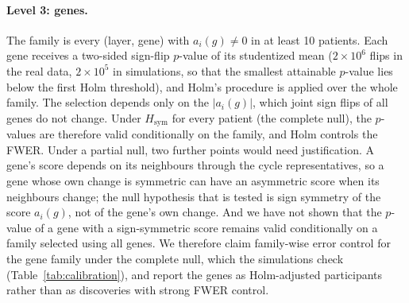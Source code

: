 \paragraph{Level 3: genes.} The family is every (layer, gene) with $a_i(g)\ne0$ in at least 10 patients. Each gene receives a two-sided sign-flip $p$-value of its studentized mean ($2\times10^{6}$ flips in the real data, $2\times10^{5}$ in simulations, so that the smallest attainable $p$-value lies below the first Holm threshold), and Holm's procedure is applied over the whole family. The selection depends only on the $|a_i(g)|$, which joint sign flips of all genes do not change. Under $H_{\mathrm{sym}}$ for every patient (the complete null), the $p$-values are therefore valid conditionally on the family, and Holm controls the FWER. Under a partial null, two further points would need justification. A gene's score depends on its neighbours through the cycle representatives, so a gene whose own change is symmetric can have an asymmetric score when its neighbours change; the null hypothesis that is tested is sign symmetry of the score $a_i(g)$, not of the gene's own change. And we have not shown that the $p$-value of a gene with a sign-symmetric score remains valid conditionally on a family selected using all genes. We therefore claim family-wise error control for the gene family under the complete null, which the simulations check (Table~\ref{tab:calibration}), and report the genes as Holm-adjusted participants rather than as discoveries with strong FWER control.

